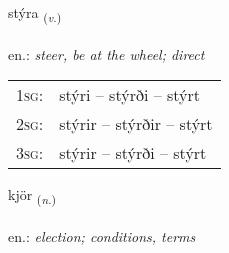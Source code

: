 \documentclass[frontgrid, backgrid]{flacards}\usepackage[]{graphicx}\usepackage[]{xcolor}
\begin{document}
\renewcommand{\flhead}{\vskip5pt \fboxsep=0pt {\small\bfseries\footnotesize Sagnorð | Verb}}
\renewcommand{\fcfoot}{\vskip5pt \fboxsep=0pt \hspace{2pt}{\small\bfseries\footnotesize 2K}}

\renewcommand{\blhead}{\vskip5pt {\small\bfseries\footnotesize Sagnorð | Verb }}
\renewcommand{\bcfoot}{\vskip5pt \hspace{2pt}{\small\bfseries\footnotesize 2K}}


{stýra \small{\textsubscript{(\textit{v.})}} \\[1ex] %
\textphonetic{[stiːra]} \\
en.: \emph{steer, be at the wheel; direct} \\  [2ex]
\renewcommand*{\arraystretch}{0.8}
\begin{tabular}{p{1cm}l}
\textsc{1sg}: & stýri -- stýrði -- stýrt \\ 
\textsc{2sg}: & stýrir -- stýrðir -- stýrt \\ 
\textsc{3sg}: & stýrir -- stýrði -- stýrt \\ 
\end{tabular}
}

\renewcommand{\flhead}{\vskip5pt \fboxsep=0pt {\small\bfseries\footnotesize Nafnorð | Noun}}
\renewcommand{\fcfoot}{\vskip5pt \fboxsep=0pt \hspace{2pt}{\small\bfseries\footnotesize 2K}}

\renewcommand{\blhead}{\vskip5pt {\small\bfseries\footnotesize Nafnorð | Noun }}
\renewcommand{\bcfoot}{\vskip5pt \hspace{2pt}{\small\bfseries\footnotesize 2K}}


{kjör \small{\textsubscript{(\textit{n.})}} \\[1ex] %
\textphonetic{[cʰœːr]} \\
en.: \emph{election; conditions, terms} \\  [2ex]
\renewcommand*{\arraystretch}{0.8}
}
\end{document}
